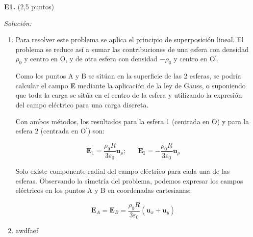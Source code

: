 \textbf{E1.} (2,5 puntos)


\vspace{20px}
\textit{Solución:}
\\

\begin{enumerate}
[label=\alph*)]
    \item Para resolver este problema se aplica el principio de superposición lineal. El problema se reduce así
    a sumar las contribuciones de una esfera con densidad $\rho_0$ y centro en O, y de otra esfera
    con densidad $-\rho_0$ y centro en O$^\prime$.

    Como los puntos A y B se sitúan en la superficie de las 2 esferas, se podría calcular el campo \textbf{E} mediante
    la aplicación de la ley de Gauss, o suponiendo que toda la carga se sitúa en el centro de la esfera y
    utilizando la expresión del campo eléctrico para una carga discreta.

    Con ambos métodos, los resultados para la esfera 1 (centrada en O) y para la esfera 2 (centrada en O$^\prime$) son:

    \begin{equation*}
        \mathbf{E}_1 = \frac{\rho_0 R}{3 \varepsilon_0} \mathbf{u}_{\rho}; \hspace{20pt}
        \mathbf{E}_2 = - \frac{\rho_0 R}{3 \varepsilon_0} \mathbf{u}_{\rho}
    \end{equation*}

    Solo existe componente radial del campo eléctrico para cada una de las esferas. Observando la simetría del
    problema, podemos expresar los campos eléctricos en los puntos A y B en coordenadas cartesianas:

    \begin{equation*}
        \mathbf{E}_A =  \mathbf{E}_B = \frac{\rho_0 R}{3 \varepsilon_0} (\mathbf{u}_x + \mathbf{u}_y )
    \end{equation*}


    \vspace{20px}
    \item awdfaef
    
    \begin{center}
\end{center}
\end{enumerate}
